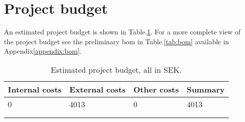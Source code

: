 \section{Project budget}
An estimated project budget is shown in Table.\:\ref{tab:estimated_budget}. For a more complete view of the project budget see the preliminary \ac{bom} in Table.\:\ref{tab:bom} available in Appendix\:\ref{appendix:bom}.
\label{section:project_budget}

\begin{table}[H]
    \begin{tabularx}{\columnwidth}{|X|X|X|X|}
        \hline
        Internal costs & External costs & Other costs & Summary \\ \hline
        0              & 4013           & 0           & 4013    \\ \hline
                       &                &             &         \\ \hline
                       &                &             &         \\ \hline
    \end{tabularx}
    \caption{Estimated project budget, all in SEK.}
    \label{tab:estimated_budget}
\end{table}


\begin{comment}
\helper{The project’s preliminary calculation – a  outline of internal and external costs for resources needed to execute the project.}

\begin{table}[H]
    \begin{tabularx}{\columnwidth}{|X|X|X|X|}
        \hline
        Internal costs & External costs & Other costs & Summary \\ \hline
                       &                &             &         \\ \hline
                       &                &             &         \\ \hline
                       &                &             &         \\ \hline
\end{tabularx}
\end{table}
\end{comment}

